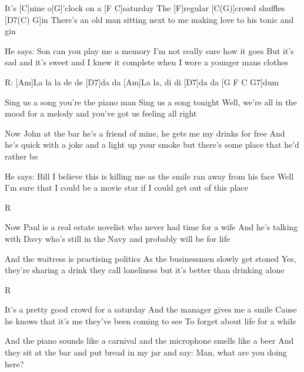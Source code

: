
It's [C]nine o[G]'clock on a [F C]saturday
The [F]regular [C(G)]crowd shuffles [D7(C) G]in
There's an old man sitting next to me
making love to his tonic and gin

He says: Son can you play me a memory
I'm not really sure how it goes
But it's sad and it's sweet and I knew it complete
when I wore a younger mans clothes

R:
[Am]La la la de de [D7]da da 
[Am]La la, di di [D7]da da [G F C G7]dum

Sing us a song you're the piano man
Sing us a song tonight
Well, we're all in the mood for a melody
and you've got us feeling all right

Now John at the bar he's a friend of mine,
he gets me my drinks for free
And he's quick with a joke and a light up your smoke
but there's some place that he'd rather be

He says: Bill I believe this is killing me
as the smile ran away from his face
Well I'm sure that I could be a movie star
if I could get out of this place

R

Now Paul is a real estate novelist
who never had time for a wife
And he's talking with Davy
who's still in the Navy
and probably will be for life

And the waitress is practising politics
As the businessmen slowly get stoned
Yes, they're sharing a drink they call loneliness
but it's better than drinking alone

R

It's a pretty good crowd for a saturday
And the manager gives me a smile
Cause he knows that it's me they've been coming to see
To forget about life for a while

And the piano sounds like a carnival
and the microphone smells like a beer
And they sit at the bar and put bread in my jar
and say: Man, what are you doing here?

